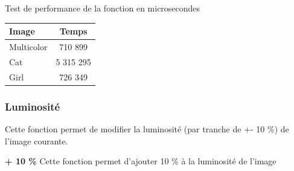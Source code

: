\documentclass{article}
\begin{document}
\begin{center}
\medbreak
Test de performance de la fonction en microsecondes
\bigbreak
   \begin{tabular}{ | l | c | }
     \hline
     Image & Temps \\
     \hline
     Multicolor & 710 899 \\
     \hline
     Cat & 5 315 295 \\
     \hline
     Girl & 726 349 \\
     \hline
   \end{tabular}
 \end{center}
\bigbreak

\subsubsection{Luminosité}

Cette fonction permet de modifier la luminosité (par tranche de +- 10 \%) de l'image courante.

\textbf{+ 10 \%}
Cette fonction permet d'ajouter 10 \% à la luminosité de l'image
\end{document}
